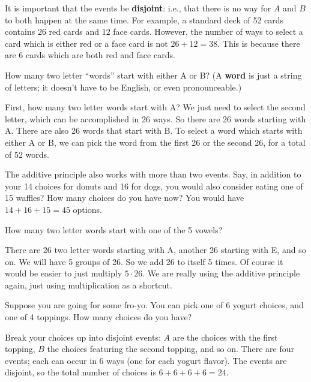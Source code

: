 \documentclass[11pt,]{book}
\newcommand{\terminology}[1]{\textbf{#1}}
\theoremstyle{ptxplainnotitle}
\theoremstyle{ptxplaintitle}
\theoremstyle{ptxdefinitionnotitle}
\theoremstyle{ptxdefinitiontitle}
\theoremstyle{ptxdefinitionnotitle}
\theoremstyle{ptxdefinitiontitle}
\theoremstyle{ptxdefinitionnotitle}
\theoremstyle{ptxdefinitiontitle}
\theoremstyle{ptxdefinitiontitlenonumber}
\theoremstyle{ptxdefinitiontitlenonumber}
\numberwithin{equation}{chapter}
\begin{document}
\hypertarget{p-990}{}%
It is important that the events be \terminology{disjoint}: i.e., that there is no way for \(A\) and \(B\) to both happen at the same time. For example, a standard deck of 52 cards contains \(26\) red cards and \(12\) face cards. However, the number of ways to select a card which is either red or a face card is not \(26 + 12 = 38\). This is because there are 6 cards which are both red and face cards.%
\begin{example}\label{example-34}
\hypertarget{p-991}{}%
How many two letter ``words'' start with either A or B? (A \terminology{word} is just a string of letters; it doesn't have to be English, or even pronounceable.)%
\par\smallskip%
\noindent\textbf{}\hypertarget{solution-136}{}\hypertarget{p-992}{}%
First, how many two letter words start with A? We just need to select the second letter, which can be accomplished in 26 ways. So there are 26 words starting with A. There are also 26 words that start with B. To select a word which starts with either A or B, we can pick the word from the first 26 or the second 26, for a total of 52 words.%
\end{example}
\hypertarget{p-993}{}%
The additive principle also works with more than two events. Say, in addition to your 14 choices for donuts and 16 for dogs, you would also consider eating one of 15 waffles? How many choices do you have now? You would have \(14 + 16 + 15 = 45\) options.%
\begin{example}\label{example-35}
\hypertarget{p-994}{}%
How many two letter words start with one of the 5 vowels?%
\par\smallskip%
\noindent\textbf{}\hypertarget{solution-137}{}\hypertarget{p-995}{}%
There are 26 two letter words starting with A, another 26 starting with E, and so on. We will have 5 groups of 26. So we add 26 to itself 5 times. Of course it would be easier to just multiply \(5\cdot 26\). We are really using the additive principle again, just using multiplication as a shortcut.%
\end{example}
\begin{example}\label{example-36}
\hypertarget{p-996}{}%
Suppose you are going for some fro-yo. You can pick one of 6 yogurt choices, and one of 4 toppings. How many choices do you have?%
\par\smallskip%
\noindent\textbf{}\hypertarget{solution-138}{}\hypertarget{p-997}{}%
Break your choices up into disjoint events: \(A\) are the choices with the first topping, \(B\) the choices featuring the second topping, and so on. There are four events; each can occur in 6 ways (one for each yogurt flavor). The events are disjoint, so the total number of choices is \(6 + 6 + 6 + 6 = 24\).%
\end{example}
\end{document}
